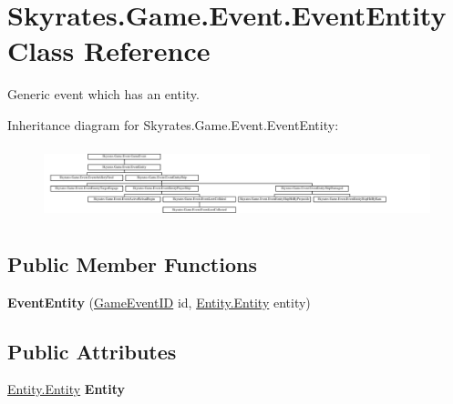 \hypertarget{class_skyrates_1_1_game_1_1_event_1_1_event_entity}{\section{Skyrates.\-Game.\-Event.\-Event\-Entity Class Reference}
\label{class_skyrates_1_1_game_1_1_event_1_1_event_entity}
}


Generic event which has an entity.  


Inheritance diagram for Skyrates.\-Game.\-Event.\-Event\-Entity\-:\begin{figure}[H]
\begin{center}
\leavevmode
\includegraphics[height=2.126582cm]{class_skyrates_1_1_game_1_1_event_1_1_event_entity}
\end{center}
\end{figure}
\subsection*{Public Member Functions}
\begin{DoxyCompactItemize}
\item 
\hypertarget{class_skyrates_1_1_game_1_1_event_1_1_event_entity_a4f6ad5c20028630e1cfd8d2248093458}{{\bfseries Event\-Entity} (\hyperlink{namespace_skyrates_1_1_game_1_1_event_ad31565d2f03f234f8f77ebf23ff8f150}{Game\-Event\-I\-D} id, \hyperlink{class_skyrates_1_1_entity_1_1_entity}{Entity.\-Entity} entity)}\label{class_skyrates_1_1_game_1_1_event_1_1_event_entity_a4f6ad5c20028630e1cfd8d2248093458}

\end{DoxyCompactItemize}
\subsection*{Public Attributes}
\begin{DoxyCompactItemize}
\item 
\hypertarget{class_skyrates_1_1_game_1_1_event_1_1_event_entity_ae29f0429dc2e93cf148df383553dfd6f}{\hyperlink{class_skyrates_1_1_entity_1_1_entity}{Entity.\-Entity} {\bfseries Entity}}\label{class_skyrates_1_1_game_1_1_event_1_1_event_entity_ae29f0429dc2e93cf148df383553dfd6f}

\end{DoxyCompactItemize}


